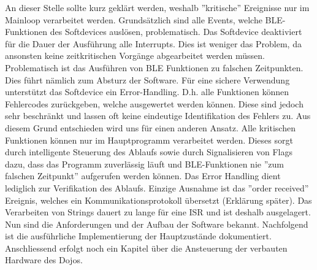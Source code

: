 An dieser Stelle sollte kurz geklärt werden, weshalb ''kritische'' Ereignisse nur im Mainloop verarbeitet werden.
Grundsätzlich sind alle Events, welche BLE-Funktionen des Softdevices auslösen, problematisch. Das Softdevice deaktiviert für die Dauer der Ausführung alle Interrupts. Dies ist weniger das Problem, da ansonsten keine zeitkritischen Vorgänge abgearbeitet werden müssen. Problematisch ist das Ausführen von BLE Funktionen zu falschen Zeitpunkten. Dies führt nämlich zum Absturz der Software. Für eine sichere Verwendung unterstützt das Softdevice ein Error-Handling. D.h. alle Funktionen können Fehlercodes zurückgeben, welche ausgewertet werden können. Diese sind jedoch sehr beschränkt und lassen oft keine eindeutige Identifikation des Fehlers zu. Aus diesem Grund entschieden wird uns für einen anderen Ansatz. Alle kritischen Funktionen können nur im Hauptprogramm verarbeitet werden. Dieses sorgt durch intelligente Steuerung des Ablaufs sowie durch Signalisieren von Flags dazu, dass das Programm zuverlässig läuft und BLE-Funktionen nie ''zum falschen Zeitpunkt'' aufgerufen werden können. Das Error Handling dient lediglich zur Verifikation des Ablaufs.
Einzige Ausnahme ist das ''order received'' Ereignis, welches ein Kommunikationsprotokoll übersetzt (Erklärung später). Das Verarbeiten von Strings dauert zu lange für eine ISR und ist deshalb ausgelagert.
Nun sind die Anforderungen und der Aufbau der Software bekannt. Nachfolgend ist die ausführliche Implementierung der Hauptzustände dokumentiert. Anschliessend erfolgt noch ein Kapitel über die Ansteuerung der verbauten Hardware des Dojos.

